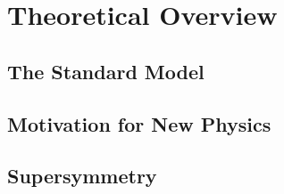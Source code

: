 \chapter{Theoretical Overview}

\section{The Standard Model}
\section{Motivation for New Physics}
\section{Supersymmetry}



